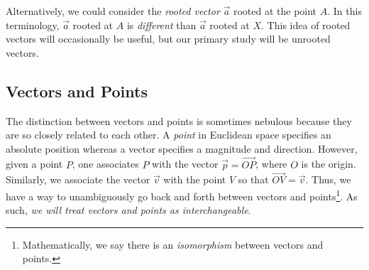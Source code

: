 \begin{center}
	\usetikzlibrary{patterns,decorations.pathreplacing}
\end{center}

Alternatively, we could consider the \emph{rooted vector}
$\vec a$ rooted at the point $A$.  In this terminology, $\vec a$ rooted
at $A$ is \emph{different} than $\vec a$ rooted at $X$.  This idea
of rooted vectors will occasionally be useful, but our primary study will be unrooted
vectors.

\subsection{Vectors and Points}
The distinction between vectors and points is sometimes nebulous because
they are so closely related to each other.  A \emph{point}
in Euclidean space specifies an absolute position whereas a vector
specifies a magnitude and direction.  However, given a point $P$,
one associates $P$ with the vector $\vec p=\overrightarrow{OP}$, where $O$
is the origin.  Similarly, we associate the vector $\vec v$ with
the point $V$ so that $\overrightarrow{OV}=\vec v$.
Thus, we have a way to unambiguously go back and forth between vectors and 
points\footnote{ Mathematically, we say there is an \emph{isomorphism} between
vectors and points.}.  As such, \emph{we will treat vectors and points
as interchangeable}.


